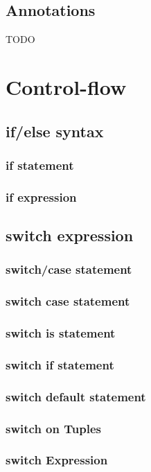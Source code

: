 \documentclass{tufte-book}
\begin{document}
            \section{Annotations}
            TODO

        \chapter{Control-flow}
            \section{if/else syntax}
            \subsection{if statement}
            \subsection{if expression}
            \section{switch expression}

            \subsection{switch/case statement}
            \subsection{switch case statement}
            \subsection{switch is statement}
            \subsection{switch if statement}
            \subsection{switch default statement}
            \subsection{switch on Tuples}
            \subsection{switch Expression}
\end{document}
